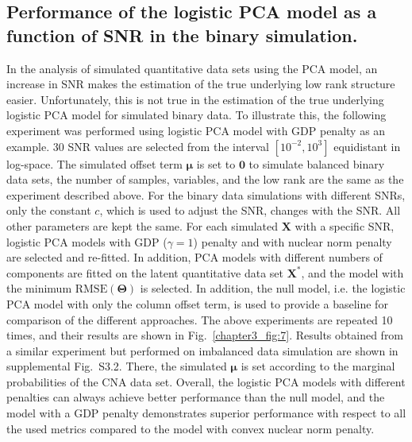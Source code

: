 \subsection{Performance of the logistic PCA model as a function of SNR in the binary simulation.}
In the analysis of simulated quantitative data sets using the PCA model, an increase in SNR makes the estimation of the true underlying low rank structure easier. Unfortunately, this is not true in the estimation of the true underlying logistic PCA model for simulated binary data. To illustrate this, the following experiment was performed using logistic PCA model with GDP penalty as an example. 30 SNR values are selected from the interval $[10^{-2}, 10^{3}]$ equidistant in log-space. The simulated offset term $\bm{\mu}$ is set to $\mathbf{0}$ to simulate balanced binary data sets, the number of samples, variables, and the low rank are the same as the experiment described above. For the binary data simulations with different SNRs, only the constant $c$, which is used to adjust the SNR, changes with the SNR. All other parameters are kept the same. For each simulated $\mathbf{X}$ with a specific SNR, logistic PCA models with GDP ($\gamma=1$) penalty and with nuclear norm penalty are selected and re-fitted. In addition, PCA models with different numbers of components are fitted on the latent quantitative data set $\mathbf{X}^{\ast}$, and the model with the minimum $\text{RMSE}(\mathbf{\Theta})$ is selected. In addition, the null model, i.e. the logistic PCA model with only the column offset term, is used to provide a baseline for comparison of the different approaches. The above experiments are repeated 10 times, and their results are shown in Fig.~\ref{chapter3_fig:7}. Results obtained from a similar experiment but performed on imbalanced data simulation are shown in supplemental Fig.~S3.2. There, the simulated $\bm{\mu}$ is set according to the marginal probabilities of the CNA data set. Overall, the logistic PCA models with different penalties can always achieve better performance than the null model, and the model with a GDP penalty demonstrates superior performance with respect to all the used metrics compared to the model with convex nuclear norm penalty.

